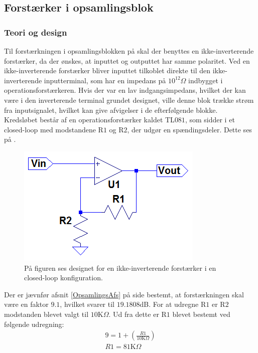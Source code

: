 \subsection{Forstærker i opsamlingsblok}\label{Subsec:Forstaerker}
\subsubsection{Teori og design}
Til forstærkningen i opsamlingsblokken på  skal der benyttes en ikke-inverterende forstærker, da der ønskes, at inputtet og outputtet har samme polaritet. Ved en ikke-inverterende forstærker bliver inputtet tilkoblet direkte til den ikke-inverterende inputterminal, som har en impedans på $10^{12}\Omega$ indbygget i operationsforstærkeren\cite{Corporation1995}. Hvis der var en lav indgangsimpedans, hvilket der kan være i den inverterende terminal grundet designet, ville denne blok trække strøm fra inputsignalet, hvilket kan give  afvigelser i de efterfølgende blokke. \\
Kredsløbet består af en operationsforstærker kaldet TL$081$, som sidder i et closed-loop med modstandene R$1$ og R$2$, der udgør en spændingsdeler. Dette ses på .
\begin{figure}[H]
\centering
\includegraphics[scale=0.75]{figures/cProblemloesning/Forstaerker.PNG}
\caption{På figuren ses designet for en ikke-inverterende forstærker i en closed-loop konfiguration.}
\label{fig:Forstaerker}
\end{figure} 

\noindent Der er jævnfør afsnit \ref{OpsamlingsAfs} på side \pageref{OpsamlingsAfs} bestemt, at forstærkningen skal være en faktor $9.1$, hvilket svarer til $19.1808$dB. For at udregne R$1$ er R$2$ modstanden blevet valgt til $10$K$\Omega$. \cite{Nilsson2011} Ud fra dette er R$1$ blevet bestemt ved følgende udregning:
\begin{align}
9 = 1 + (\frac{R1}{10\text{K}\Omega})\\
R1 = 81\text{K}\Omega
\end{align}

